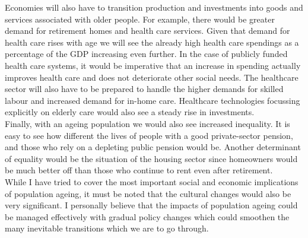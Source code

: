 \documentclass[12pt]{article}
\begin{document}
Economies will also have to transition production and investments into goods and services associated with older people. For example, there would be greater demand for retirement homes and health care services. Given that demand for health care rises with age we will see the already high health care spendings as a percentage of the GDP increasing even further. In the case of publicly funded health care systems, it would be imperative that an increase in spending actually improves health care and does not deteriorate other social needs. The healthcare sector will also have to be prepared to handle the higher demands for skilled labour and increased demand for in-home care. Healthcare technologies focussing explicitly on elderly care would also see a steady rise in investments. \\
Finally, with an ageing population we would also see increased inequality. It is easy to see how different the lives of people with a good private-sector pension, and those who rely on a depleting public pension would be. Another determinant of equality would be the situation of the housing sector since homeowners would be much better off than those who continue to rent even after retirement.\\
While I have tried to cover the most important social and economic implications of population ageing, it must be noted that the cultural changes would also be very significant. I personally believe that the impacts of population ageing could be managed effectively with gradual policy changes which could smoothen the many inevitable transitions which we are to go through.
\end{document}
